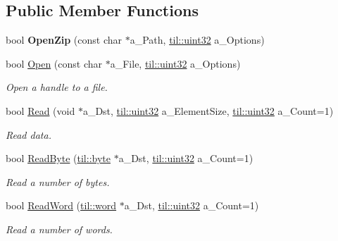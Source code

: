 \subsection*{Public Member Functions}
\begin{DoxyCompactItemize}
\item 
\hypertarget{class_file_stream_zip_ae7c8b9d9770587ee3b25d19fa79c622c}{
bool {\bfseries OpenZip} (const char $\ast$a\_\-Path, \hyperlink{namespacetil_a20db61688ed403d11f057a508d87e54c}{til::uint32} a\_\-Options)}
\label{class_file_stream_zip_ae7c8b9d9770587ee3b25d19fa79c622c}

\item 
bool \hyperlink{class_file_stream_zip_a798a6a850c904ca7239f19dbbe1703b4}{Open} (const char $\ast$a\_\-File, \hyperlink{namespacetil_a20db61688ed403d11f057a508d87e54c}{til::uint32} a\_\-Options)
\begin{DoxyCompactList}\small\item\em Open a handle to a file. \item\end{DoxyCompactList}\item 
bool \hyperlink{class_file_stream_zip_a106eb851f981039bf3518f3ee879ebee}{Read} (void $\ast$a\_\-Dst, \hyperlink{namespacetil_a20db61688ed403d11f057a508d87e54c}{til::uint32} a\_\-ElementSize, \hyperlink{namespacetil_a20db61688ed403d11f057a508d87e54c}{til::uint32} a\_\-Count=1)
\begin{DoxyCompactList}\small\item\em Read data. \item\end{DoxyCompactList}\item 
bool \hyperlink{class_file_stream_zip_ad861b80be4f82112433d80ba53e515cd}{ReadByte} (\hyperlink{namespacetil_a5f3ec10aca1a788b495a0bd3787bc2dc}{til::byte} $\ast$a\_\-Dst, \hyperlink{namespacetil_a20db61688ed403d11f057a508d87e54c}{til::uint32} a\_\-Count=1)
\begin{DoxyCompactList}\small\item\em Read a number of bytes. \item\end{DoxyCompactList}\item 
bool \hyperlink{class_file_stream_zip_a5eb20030791cacf77e8c3dc28e8db494}{ReadWord} (\hyperlink{namespacetil_a7903a6761ac6f7472530b2863401909e}{til::word} $\ast$a\_\-Dst, \hyperlink{namespacetil_a20db61688ed403d11f057a508d87e54c}{til::uint32} a\_\-Count=1)
\begin{DoxyCompactList}\small\item\em Read a number of words. \item\end{DoxyCompactList}\item 

\end{DoxyCompactItemize}

